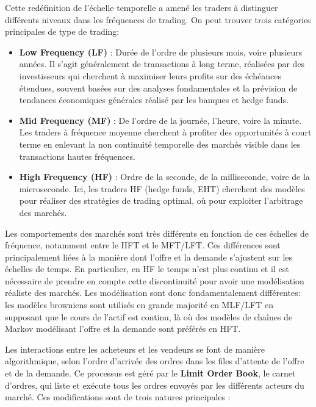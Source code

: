 \documentclass[12pt,a4paper]{article}
\theoremstyle{definition}
\theoremstyle{remark}
\begin{document}
    Cette redéfinition de l'échelle temporelle a amené les traders à distinguer différents niveaux dans les fréquences de trading. On peut trouver trois catégories principales de type de trading:

    \begin{itemize}
        \item \textbf{Low Frequency (LF)} : Durée de l'ordre de plusieurs mois, voire plusieurs années. Il s'agit généralement de transactions à long terme, réalisées par des investisseurs qui cherchent à maximiser leurs profits sur des échéances étendues, souvent basées sur des analyses fondamentales et la prévision de tendances économiques générales réalisé par les banques et hedge funds.

        \item \textbf{Mid Frequency (MF)} : De l'ordre de la journée, l'heure, voire la minute. Les traders à fréquence moyenne cherchent à profiter des opportunités à court terme en enlevant la non continuité temporelle des marchés visible dans les transactions hautes fréquences. 

        \item \textbf{High Frequency (HF)} : Ordre de la seconde, de la milliseconde, voire de la microseconde. Ici, les traders HF (hedge funds, EHT) cherchent des modèles pour réaliser des stratégies de trading optimal, où pour exploiter l'arbitrage des marchés.
    \end{itemize}

    Les comportements des marchés sont très différents en fonction de ces échelles de fréquence, notamment entre le HFT et le MFT/LFT. Ces différences sont principalement liées à la manière dont l'offre et la demande s'ajustent sur les échelles de temps. En particulier, en HF le temps n'est plus continu et il est nécessaire de prendre en compte cette discontinuité pour avoir une modélisation réaliste des marchés. Les modélisation sont donc fondamentalement différentes: les modèles browniens sont utilisés en grande majorité en MLF/LFT en supposant que le cours de l'actif est continu, là où des modèles de chaînes de Markov modélisant l'offre et la demande sont préférés en HFT.

    Les interactions entre les acheteurs et les vendeurs se font de manière algorithmique, selon l'ordre d'arrivée des ordres dans les files d'attente de l'offre et de la demande. Ce processus est géré par le \textbf{Limit Order Book}, le carnet d'ordres, qui liste et exécute tous les ordres envoyés par les différents acteurs du marché. Ces modifications sont de trois natures principales :
\end{document}
